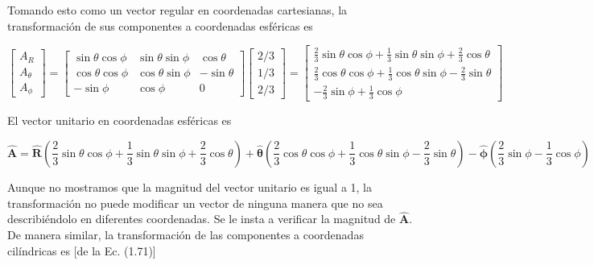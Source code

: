 \documentclass{book}
\begin{document}
Tomando esto como un vector regular en coordenadas cartesianas, la transformación de sus componentes a coordenadas esféricas es

\begin{equation*}
\begin{bmatrix} A_R \\ A_{\theta} \\ A_{\phi} \end{bmatrix} = 
\begin{bmatrix} 
\sin \theta \cos \phi & \sin \theta \sin \phi & \cos \theta \\
\cos \theta \cos \phi & \cos \theta \sin \phi & -\sin \theta \\
-\sin \phi & \cos \phi & 0 
\end{bmatrix}
\begin{bmatrix} 2/3 \\ 1/3 \\ 2/3 \end{bmatrix} = 
\begin{bmatrix} 
\frac{2}{3} \sin \theta \cos \phi + \frac{1}{3} \sin \theta \sin \phi + \frac{2}{3} \cos \theta \\
\frac{2}{3} \cos \theta \cos \phi + \frac{1}{3} \cos \theta \sin \phi - \frac{2}{3} \sin \theta \\
-\frac{2}{3} \sin \phi + \frac{1}{3} \cos \phi
\end{bmatrix}
\end{equation*}

El vector unitario en coordenadas esféricas es

\begin{equation*}
\mathbf{\hat{A}} = \mathbf{\hat{R}} \left( \frac{2}{3} \sin \theta \cos \phi + \frac{1}{3} \sin \theta \sin \phi + \frac{2}{3} \cos \theta \right) + \mathbf{\hat{\theta}} \left( \frac{2}{3} \cos \theta \cos \phi + \frac{1}{3} \cos \theta \sin \phi - \frac{2}{3} \sin \theta \right) - \mathbf{\hat{\phi}} \left( \frac{2}{3} \sin \phi - \frac{1}{3} \cos \phi \right)
\end{equation*}

Aunque no mostramos que la magnitud del vector unitario es igual a 1, la transformación no puede modificar un vector de ninguna manera que no sea describiéndolo en diferentes coordenadas. Se le insta a verificar la magnitud de $\mathbf{\hat{A}}$. De manera similar, la transformación de las componentes a coordenadas cilíndricas es [de la Ec. (1.71)]
\end{document}
